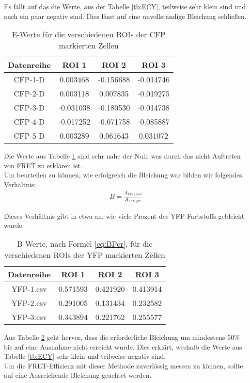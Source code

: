 Es fällt auf das die Werte, aus der Tabelle \ref{tb:ECY}, teilweise sehr klein sind und auch ein paar negativ sind. Dies lässt auf eine unvollständige Bleichung schließen.

\begin{table}[h]
    \centering
    \begin{tabular}{c|c|c|c}
        Datenreihe &     ROI 1 &     ROI 2 &     ROI 3 \\\hline\hline
        CFP-1-D &  0.003468 & -0.156688 & -0.014746 \\\hline
        CFP-2-D &  0.003118 &  0.007835 & -0.019275 \\\hline
        CFP-3-D & -0.031038 & -0.180530 & -0.014738 \\\hline
        CFP-4-D & -0.017252 & -0.071758 & -0.085887 \\\hline
        CFP-5-D &  0.003289 &  0.061643 &  0.031072 \\\hline
        \end{tabular}
        \caption{E-Werte für die verschiedenen ROIs der CFP markierten Zellen}
        \label{tb:ECFP}
\end{table}

Die Werte aus Tabelle \ref{tb:ECFP} sind sehr nahe der Null, was durch das nicht Auftreten von FRET zu erklären ist.\\

Um beurteilen zu können, wie erfolgreich die Bleichung war bilden wir folgendes Verhältnis:
\begin{align}
    B = \frac{A_{YFP,post}}{A_{YFP,pre}}
    \label{eq:BPer}
\end{align}

Dieses Verhältnis gibt in etwa an, wie viele Prozent des YFP Farbstoffs gebleicht wurde.

\begin{table}[h]
    \centering
    \begin{tabular}{c|c|c|c}
        Datenreihe &     ROI 1 &     ROI 2 &     ROI 3 \\\hline\hline
        YFP-1.csv &  0.571593 &  0.421920 &  0.413914 \\\hline
        YFP-2.csv &  0.291005 &  0.131434 &  0.232582 \\\hline
        YFP-3.csv &  0.343894 &  0.221762 &  0.255577 \\\hline
        \end{tabular}
        \caption{B-Werte, nach Formel \ref{eq:BPer}, für die verschiedenen ROIs der YFP markierten Zellen}
        \label{tb:BYFP}
\end{table}

Aus Tabelle \ref{tb:BYFP} geht hervor, dass die erforderliche Bleichung um mindestens $50 \%$ bis auf eine Ausnahme nicht erreicht wurde. Dies erklärt, weshalb die Werte aus Tabelle \ref{tb:ECY} sehr klein und teilweise negativ sind.\\
Um die FRET-Effizienz mit dieser Methode zuverlässig messen zu können, sollte auf eine Ausreichende Bleichung geachtet werden.